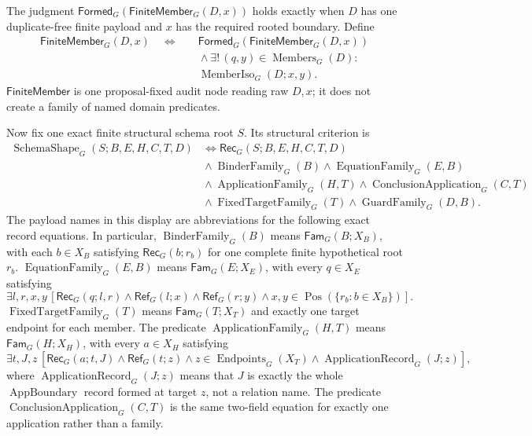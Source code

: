 \documentclass[11pt,twoside]{article}
\newcommand{\Formed}{\mathsf{Formed}}
\newcommand{\FiniteMember}{\mathsf{FiniteMember}}
\newcommand{\Rec}{\mathsf{Rec}}
\newcommand{\Fam}{\mathsf{Fam}}
\newcommand{\RefPos}{\mathsf{Ref}}
\begin{document}
The judgment \(\Formed_G(\FiniteMember_G(D,x))\) holds exactly when \(D\) has one
duplicate-free finite payload and \(x\) has the required rooted boundary.  Define
\[
\begin{aligned}
 \FiniteMember_G(D,x)
 \quad\Longleftrightarrow\quad&
 \Formed_G(\FiniteMember_G(D,x))\\[-0.2em]
 &{}\land
 \exists!\,(q,y)\in\operatorname{Members}_G(D):\\[-0.2em]
 &\operatorname{MemberIso}_G(D;x,y).
\end{aligned}
\]
\(\FiniteMember\) is one proposal-fixed audit node reading raw \(D,x\); it does
not create a family of named domain predicates.

Now fix one exact finite structural schema root \(S\).  Its structural criterion is
\[
\begin{split}
 \operatorname{SchemaShape}_G(S;B,E,H,C,T,D)
 &\Longleftrightarrow \Rec_G(S;B,E,H,C,T,D)\\
 &{}\land\operatorname{BinderFamily}_G(B)
 \land\operatorname{EquationFamily}_G(E,B)\\
 &{}\land\operatorname{ApplicationFamily}_G(H,T)
 \land\operatorname{ConclusionApplication}_G(C,T)\\
 &{}\land\operatorname{FixedTargetFamily}_G(T)
 \land\operatorname{GuardFamily}_G(D,B).
\end{split}
\]
The payload names in this display are abbreviations for the following exact
record equations.  In particular, \(\operatorname{BinderFamily}_G(B)\) means
\(\Fam_G(B;X_B)\), with each \(b\in X_B\) satisfying
\(\Rec_G(b;r_b)\) for one complete finite hypothetical root \(r_b\).
\(\operatorname{EquationFamily}_G(E,B)\) means \(\Fam_G(E;X_E)\), with every
\(q\in X_E\) satisfying
\[
 \exists l,r,x,y\,[\Rec_G(q;l,r)\land\RefPos_G(l;x)
   \land\RefPos_G(r;y)\land x,y\in
   \operatorname{Pos}(\{r_b:b\in X_B\})].
\]
\(\operatorname{FixedTargetFamily}_G(T)\) means \(\Fam_G(T;X_T)\) and exactly
one target endpoint for each member.  The predicate
\(\operatorname{ApplicationFamily}_G(H,T)\)
means \(\Fam_G(H;X_H)\), with every \(a\in X_H\) satisfying
\[
 \exists t,J,z\,[\Rec_G(a;t,J)\land\RefPos_G(t;z)
   \land z\in\operatorname{Endpoints}_G(X_T)
   \land\operatorname{ApplicationRecord}_G(J;z)],
\]
where \(\operatorname{ApplicationRecord}_G(J;z)\) means that \(J\) is exactly
the whole \(\operatorname{AppBoundary}\) record formed at target \(z\), not a
relation name.  The predicate \(\operatorname{ConclusionApplication}_G(C,T)\)
is the same two-field equation for exactly one application rather than a family.
\end{document}
